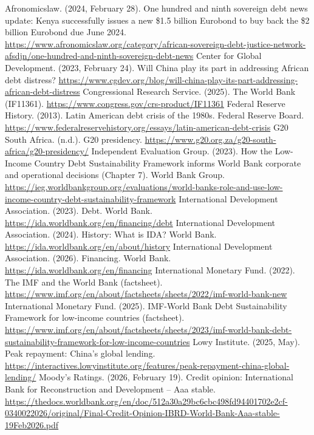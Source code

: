 
\begin{referencelist}
   Afronomicslaw. (2024, February 28). One hundred and ninth sovereign debt news update: Kenya successfully issues a new \$1.5 billion Eurobond to buy back the \$2 billion Eurobond due June 2024. \url{https://www.afronomicslaw.org/category/african-sovereign-debt-justice-network-afsdjn/one-hundred-and-ninth-sovereign-debt-news}
   Center for Global Development. (2023, February 24). Will China play its part in addressing African debt distress? \url{https://www.cgdev.org/blog/will-china-play-its-part-addressing-african-debt-distress}
   Congressional Research Service. (2025). The World Bank (IF11361). \url{https://www.congress.gov/crs-product/IF11361}
   Federal Reserve History. (2013). Latin American debt crisis of the 1980s. Federal Reserve Board. \url{https://www.federalreservehistory.org/essays/latin-american-debt-crisis}
   G20 South Africa. (n.d.). G20 presidency. \url{https://www.g20.org.za/g20-south-africa/g20-presidency/}
   Independent Evaluation Group. (2023). How the Low-Income Country Debt Sustainability Framework informs World Bank corporate and operational decisions (Chapter 7). World Bank Group. \url{https://ieg.worldbankgroup.org/evaluations/world-banks-role-and-use-low-income-country-debt-sustainability-framework}
   International Development Association. (2023). Debt. World Bank. \url{https://ida.worldbank.org/en/financing/debt}
   International Development Association. (2024). History: What is IDA? World Bank. \url{https://ida.worldbank.org/en/about/history}
   International Development Association. (2026). Financing. World Bank. \url{https://ida.worldbank.org/en/financing}
   International Monetary Fund. (2022). The IMF and the World Bank (factsheet). \url{https://www.imf.org/en/about/factsheets/sheets/2022/imf-world-bank-new}
   International Monetary Fund. (2025). IMF-World Bank Debt Sustainability Framework for low-income countries (factsheet). \url{https://www.imf.org/en/about/factsheets/sheets/2023/imf-world-bank-debt-sustainability-framework-for-low-income-countries}
   Lowy Institute. (2025, May). Peak repayment: China's global lending. \url{https://interactives.lowyinstitute.org/features/peak-repayment-china-global-lending/}
   Moody's Ratings. (2026, February 19). Credit opinion: International Bank for Reconstruction and Development – Aaa stable. \url{https://thedocs.worldbank.org/en/doc/512a30a29bc6cbc498fd94401702e2cf-0340022026/original/Final-Credit-Opinion-IBRD-World-Bank-Aaa-stable-19Feb2026.pdf}

\end{referencelist}
